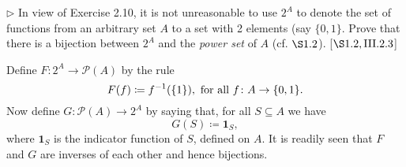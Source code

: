 \begin{exercise}
	\(\triangleright\) In view of Exercise 2.10, it is not unreasonable to use \(2^A\) to denote the set of functions from an arbitrary set \(A\) to a set with 2 elements (say \(\{0, 1\}\). Prove that there is a bijection between \(2^A\) and the \textit{power set} of \(A\) (cf. \(\S 1.2\)). [\(\S 1.2, \RNo{3}.2.3\)]
\end{exercise}
\begin{solution}
	Define $F\colon 2^A \to \mathscr{P}(A)$ by the rule
	\[
		F(f) \coloneqq f^{-1}(\{1\}),\textnormal{ for all }f\colon A \to \{0,1\}.
	\]
	Now define $G\colon \mathscr{P}(A) \to 2^A$ by saying that, for all $S \subseteq A$ we have
	\[
		G(S) \coloneqq \mathbf{1}_S,
	\]
	where $\mathbf{1}_S$ is the indicator function of $S$, defined on $A$. It is readily seen that $F$ and $G$ are inverses of each other and hence bijections.
\end{solution}